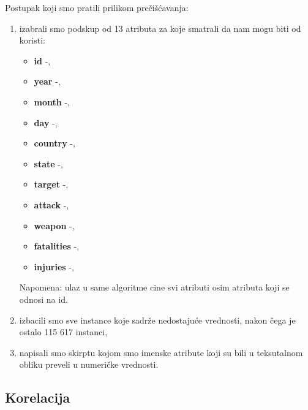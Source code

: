 \documentclass[a4paper]{article}
\begin{document}
Postupak koji smo pratili prilikom prečišćavanja:
\begin{enumerate} 
	\item izabrali smo podskup od 13 atributa za koje smatrali da nam mogu biti od koristi: 
	\begin{itemize}
		\item \textbf{id} -,
		\item \textbf{year} -,
		\item \textbf{month} -,
		\item \textbf{day} -,
		\item \textbf{country} -,
		\item \textbf{state} -,
		\item \textbf{target} -,
		\item \textbf{attack} -,
		\item \textbf{weapon} -,
		\item \textbf{fatalities} -,
		\item \textbf{injuries} -,\\
	\end{itemize}
	Napomena: ulaz u same algoritme cine svi atributi osim atributa koji se odnosi na id. 
\item izbacili smo sve instance koje sadrže nedostajuće vrednosti, nakon čega je ostalo 115 617 instanci,
\item napisali smo skirptu kojom smo imenske atribute koji su bili u teksutalnom obliku preveli u numeričke vrednosti.

\end{enumerate}

\subsection{Korelacija}
  
\end{document}

